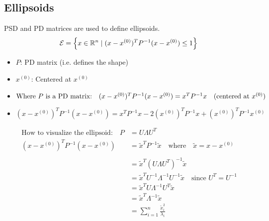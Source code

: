 \subsection{Ellipsoids}
\begin{definition}
    PSD and PD matrices are used to define ellipsoids.
    \begin{equation*}
        \mathcal{E} = \left\{ x \in \mathbb{R}^n \mid (x - x^{(0)})^T P^{-1} (x - x^{(0)}) \leq 1 \right\} \\
    \end{equation*}       
    \begin{itemize}
        \item $P$: PD matrix (i.e. defines the shape)
        \item $x^{(0)}$: Centered at $x^{(0)}$
        \item $\text{Where } P \text{ is a PD matrix:} \quad (x - x^{(0)})^T P^{-1} (x - x^{(0)}) = x^T P^{-1} x \quad \text{(centered at \( x^{(0)} \))}$
        \item $(x - x^{(0)})^T P^{-1} (x - x^{(0)}) = x^T P^{-1} x - 2(x^{(0)})^T P^{-1} x + (x^{(0)})^T P^{-1} x^{(0)}$
    \end{itemize}
\end{definition}

\begin{derivation}
    \begin{align*}
        \text{How to visualize the ellipsoid:} \quad P &= U \Lambda U^T \\
        (x - x^{(0)})^T P^{-1} (x - x^{(0)}) &= \tilde{x}^T P^{-1} \tilde{x} \quad \text{where} \quad \tilde{x} = x - x^{(0)} \\
        \\
        &= \tilde{x}^T \left( U \Lambda U^T \right)^{-1} \tilde{x} \\
        &= \tilde{x}^T U^{-1} \Lambda^{-1} U^{-1} \tilde{x} \quad \text{since } U^T = U^{-1} \\
        &= \tilde{x}^T U \Lambda^{-1} U^T \tilde{x} \\
        &= \tilde{x}^T \Lambda^{-1} \tilde{x} \\
        &= \sum_{i=1}^{n} \frac{\tilde{x}_i^2}{\lambda_i}
    \end{align*} 
\end{derivation}